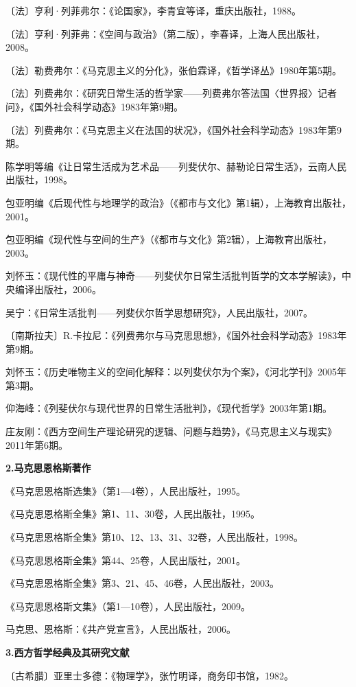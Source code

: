 \documentclass[UTF8, fontset = sourcesans, a4paper, oneside, zihao =
-4, scheme=chinese, no-math, space=true]{ctexbook}
\begin{document}
〔法〕亨利·列菲弗尔：《论国家》，李青宜等译，重庆出版社，1988。

〔法〕亨利·列菲弗：《空间与政治》（第二版），李春译，上海人民出版社，2008。

〔法〕勒费弗尔：《马克思主义的分化》，张伯霖译，《哲学译丛》1980年第5期。

〔法〕列费弗尔：《研究日常生活的哲学家------列费弗尔答法国〈世界报〉记者问》，《国外社会科学动态》1983年第9期。

〔法〕列费弗尔：《马克思主义在法国的状况》，《国外社会科学动态》1983年第9期。

陈学明等编《让日常生活成为艺术品------列斐伏尔、赫勒论日常生活》，云南人民出版社，1998。

包亚明编《后现代性与地理学的政治》（《都市与文化》第1辑），上海教育出版社，2001。

包亚明编《现代性与空间的生产》（《都市与文化》第2辑），上海教育出版社，2003。

刘怀玉：《现代性的平庸与神奇------列斐伏尔日常生活批判哲学的文本学解读》，中央编译出版社，2006。

吴宁：《日常生活批判------列斐伏尔哲学思想研究》，人民出版社，2007。

〔南斯拉夫〕R.卡拉尼：《列费弗尔与马克思思想》，《国外社会科学动态》1983年第9期。

刘怀玉：《历史唯物主义的空间化解释：以列斐伏尔为个案》，《河北学刊》2005年第3期。

仰海峰：《列斐伏尔与现代世界的日常生活批判》，《现代哲学》2003年第1期。

庄友刚：《西方空间生产理论研究的逻辑、问题与趋势》，《马克思主义与现实》2011年第6期。

\textbf{2.马克思恩格斯著作}

《马克思恩格斯选集》（第1---4卷），人民出版社，1995。

《马克思恩格斯全集》第1、11、30卷，人民出版社，1995。

《马克思恩格斯全集》第10、12、13、31、32卷，人民出版社，1998。

《马克思恩格斯全集》第44、25卷，人民出版社，2001。

《马克思恩格斯全集》第3、21、45、46卷，人民出版社，2003。

《马克思恩格斯文集》（第1---10卷），人民出版社，2009。

马克思、恩格斯：《共产党宣言》，人民出版社，2006。

\textbf{3.西方哲学经典及其研究文献}

〔古希腊〕亚里士多德：《物理学》，张竹明译，商务印书馆，1982。
\end{document}

